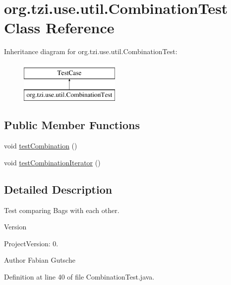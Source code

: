 \hypertarget{classorg_1_1tzi_1_1use_1_1util_1_1_combination_test}{\section{org.\-tzi.\-use.\-util.\-Combination\-Test Class Reference}
\label{classorg_1_1tzi_1_1use_1_1util_1_1_combination_test}
}
Inheritance diagram for org.\-tzi.\-use.\-util.\-Combination\-Test\-:\begin{figure}[H]
\begin{center}
\leavevmode
\includegraphics[height=2.000000cm]{classorg_1_1tzi_1_1use_1_1util_1_1_combination_test}
\end{center}
\end{figure}
\subsection*{Public Member Functions}
\begin{DoxyCompactItemize}
\item 
void \hyperlink{classorg_1_1tzi_1_1use_1_1util_1_1_combination_test_aeacc017dd98b39137e34aaace0112982}{test\-Combination} ()
\item 
void \hyperlink{classorg_1_1tzi_1_1use_1_1util_1_1_combination_test_ac9c23952c436a69d1f1951ab2779f818}{test\-Combination\-Iterator} ()
\end{DoxyCompactItemize}


\subsection{Detailed Description}
Test comparing Bags with each other.

\begin{DoxyVersion}{Version}

\end{DoxyVersion}
\begin{DoxyParagraph}{Project\-Version\-:}
0. 
\end{DoxyParagraph}
\begin{DoxyAuthor}{Author}
Fabian Gutsche 
\end{DoxyAuthor}


Definition at line 40 of file Combination\-Test.\-java.



